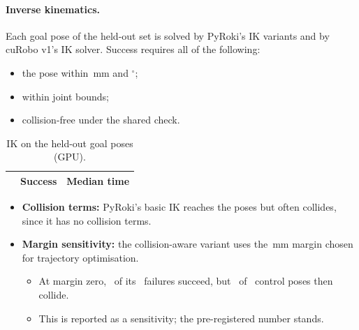 \documentclass[11pt]{article}
\begin{document}
\paragraph{Inverse kinematics.} Each goal pose of the held-out set is solved by PyRoki's IK variants and by cuRobo v1's IK solver. Success requires all of the following:
\begin{itemize}
  \item the pose within \ttEndMm\,mm and \ttEndDeg$^\circ$;
  \item within joint bounds;
  \item collision-free under the shared check.
\end{itemize}
\begin{table}[ht]\centering\footnotesize
\caption{IK on the held-out goal poses (GPU).}\label{tab:ik}
\begin{tabular}{@{}l cc@{}}\toprule
 & Success & Median time \\\midrule
\end{tabular}
\end{table}
\begin{itemize}
  \item \textbf{Collision terms:} PyRoki's basic IK reaches the poses but often collides, since it has no collision terms.
  \item \textbf{Margin sensitivity:} the collision-aware variant uses the \pyMargin\,mm margin chosen for trajectory optimisation.
  \begin{itemize}
    \item At margin zero, \ikZeroOk\ of its \ikFailFive\ failures succeed, but \ikCtrlColl\ of \ikCtrl\ control poses then collide.
    \item This is reported as a sensitivity; the pre-registered number stands.
  \end{itemize}
\end{itemize}
\end{document}
